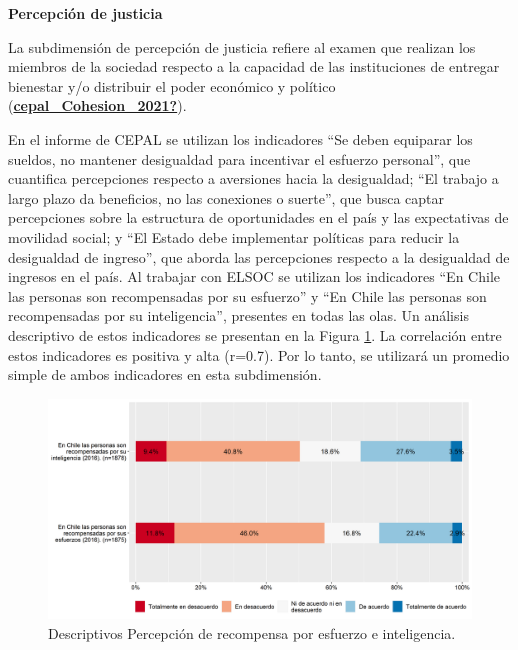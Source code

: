 \documentclass[
  12pt,
]{book}
\begin{document}
\textbf{Percepción de justicia}

La subdimensión de percepción de justicia refiere al examen que realizan los miembros de la sociedad respecto a la capacidad de las instituciones de entregar bienestar y/o distribuir el poder económico y político (\protect\hyperlink{ref-cepal_Cohesion_2021}{\textbf{cepal\_Cohesion\_2021?}}).

En el informe de CEPAL se utilizan los indicadores ``Se deben equiparar los sueldos, no mantener desigualdad para incentivar el esfuerzo personal'', que cuantifica percepciones respecto a aversiones hacia la desigualdad; ``El trabajo a largo plazo da beneficios, no las conexiones o suerte'', que busca captar percepciones sobre la estructura de oportunidades en el país y las expectativas de movilidad social; y ``El Estado debe implementar políticas para reducir la desigualdad de ingreso'', que aborda las percepciones respecto a la desigualdad de ingresos en el país. Al trabajar con ELSOC se utilizan los indicadores ``En Chile las personas son recompensadas por su esfuerzo'' y ``En Chile las personas son recompensadas por su inteligencia'', presentes en todas las olas. Un análisis descriptivo de estos indicadores se presentan en la Figura \ref{fig:justicia}. La correlación entre estos indicadores es positiva y alta (r=0.7). Por lo tanto, se utilizará un promedio simple de ambos indicadores en esta subdimensión.

\begin{figure}[H]

{\centering \includegraphics[width=1\linewidth,height=1\textheight]{output/graphs/justicia} 

}

\caption{Descriptivos Percepción de recompensa por esfuerzo e inteligencia.}\label{fig:justicia}
\end{figure}
\end{document}
